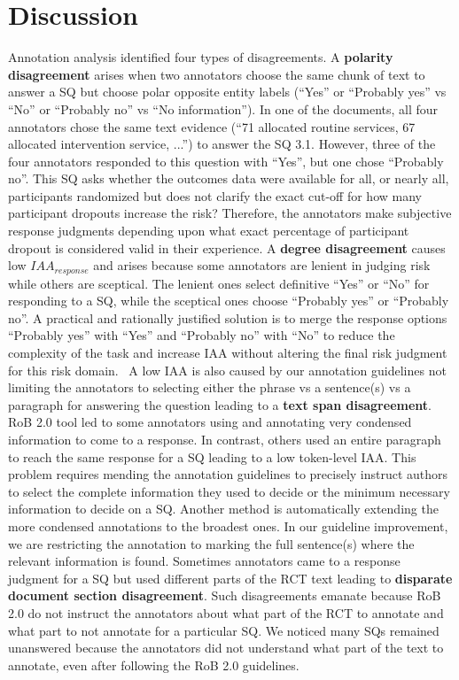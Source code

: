 \documentclass{IOS-Book-Article}
\begin{document}
\section{Discussion}
\label{sec:disc}
%
Annotation analysis identified four types of disagreements. 
A \textbf{polarity disagreement} arises when two annotators choose the same chunk of text to answer a SQ but choose polar opposite entity labels (``Yes'' or ``Probably yes'' vs ``No'' or ``Probably no'' vs ``No information'').
In one of the documents, all four annotators chose the same text evidence (``71 allocated routine services, 67 allocated intervention service, ...'') to answer the SQ 3.1.
However, three of the four annotators responded to this question with ``Yes'', but one chose ``Probably no''.
This SQ asks whether the outcomes data were available for all, or nearly all, participants randomized but does not clarify the exact cut-off for how many participant dropouts increase the risk?
Therefore, the annotators make subjective response judgments depending upon what exact percentage of participant dropout is considered valid in their experience.
A \textbf{degree disagreement} causes low $IAA_{response}$ and arises because some annotators are lenient in judging risk while others are sceptical.
The lenient ones select definitive ``Yes'' or ``No'' for responding to a SQ, while the sceptical ones choose ``Probably yes'' or ``Probably no''.
A practical and rationally justified solution is to merge the response options ``Probably yes'' with ``Yes'' and ``Probably no'' with ``No'' to reduce the complexity of the task and increase IAA without altering the final risk judgment for this risk domain.~\cite{sterne2019rob}
A low IAA is also caused by our annotation guidelines not limiting the annotators to selecting either the phrase vs a sentence(s) vs a paragraph for answering the question leading to a \textbf{text span disagreement}.
RoB 2.0 tool led to some annotators using and annotating very condensed information to come to a response.
In contrast, others used an entire paragraph to reach the same response for a SQ leading to a low token-level IAA.
This problem requires mending the annotation guidelines to precisely instruct authors to select the complete information they used to decide or the minimum necessary information to decide on a SQ.
Another method is automatically extending the more condensed annotations to the broadest ones.
In our guideline improvement, we are restricting the annotation to marking the full sentence(s) where the relevant information is found.
Sometimes annotators came to a response judgment for a SQ but used different parts of the RCT text leading to \textbf{disparate document section disagreement}.
Such disagreements emanate because RoB 2.0 do not instruct the annotators about what part of the RCT to annotate and what part to not annotate for a particular SQ.
We noticed many SQs remained unanswered because the annotators did not understand what part of the text to annotate, even after following the RoB 2.0 guidelines.
%
%
%
\end{document}
